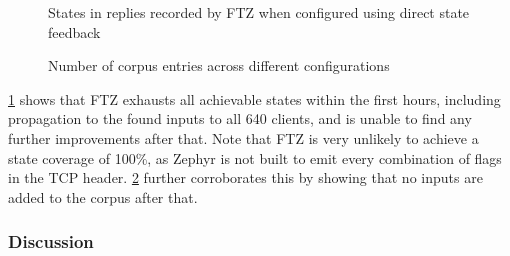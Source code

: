 \documentclass[twocolumn]{article}
\newcommand{\proj}{FTZ\xspace}
\begin{document}
\begin{figure}
  \caption{States in replies recorded by \proj when configured using direct state feedback}
  \label{fig:eval-state-cov}
\end{figure}

\begin{figure}
  \caption{Number of corpus entries across different configurations}
  \label{fig:eval-corpus}
\end{figure}

\cref{fig:eval-state-cov} shows that \proj exhausts all achievable states within the first hours, including propagation to the found inputs to all 640 clients, and is unable to find any further improvements after that. Note that \proj is very unlikely to achieve a state coverage of 100\%, as Zephyr is not built to emit every combination of flags in the TCP header. \cref{fig:eval-corpus} further corroborates this by showing that no inputs are added to the corpus after that.

\subsubsection*{Discussion}
\end{document}
